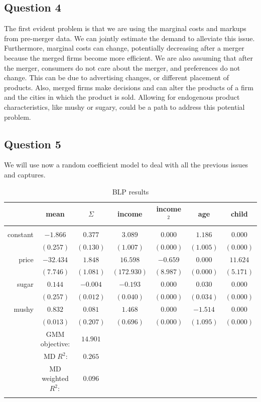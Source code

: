 \documentclass{article}
\theoremstyle{definition}
\begin{document}
\subsection*{Question 4}
The first evident problem is that we are using the marginal costs and markups from pre-merger data. We can jointly estimate the demand to alleviate this issue. Furthermore, marginal costs can change, potentially decreasing after a merger because the merged firms become more efficient. We are also assuming that after the merger, consumers do not care about the merger, and preferences do not change. This can be due to advertising changes, or different placement of products. Also, merged firms make decisions and can alter the products of a firm and the cities in which the product is sold. Allowing for endogenous product characteristics, like mushy or sugary, could be a path to address this potential problem. 

\subsection*{Question 5}

We will use now a random coefficient model to deal with all the previous issues and captures.
\begin{table}[h]
    \centering
\begin{tabular}{rcccccc} 
\hline 
& mean & $\Sigma$ & income & income $^{2}$ & age &  child \\
\hline & & & & & & \\
constant & $-1.866$ & $0.377$ & $3.089$ & $0.000$ & $1.186$ & $0.000$ \\
& $(0.257)$ & $(0.130)$ & $(1.007)$ & $(0.000)$ & $(1.005)$ & $(0.000)$ \\
price & $-32.434$ & $1.848$ & $16.598$ & $-0.659$ & $0.000$ & $11.624$ \\
& $(7.746)$ & $(1.081)$ & $(172.930)$ & $(8.987)$ & $(0.000)$ & $(5.171)$ \\
sugar & $0.144$ & $-0.004$ & $-0.193$ & $0.000$ & $0.030$ & $0.000$ \\
& $(0.257)$ & $(0.012)$ & $(0.040)$ & $(0.000)$ & $(0.034)$ & $(0.000)$ \\
mushy & $0.832$ & $0.081$ & $1.468$ & $0.000$ & $-1.514$ & $0.000$ \\
& $(0.013)$ & $(0.207)$ & $(0.696)$ & $(0.000)$ & $(1.095)$ & $(0.000)$\\
\hline 
& GMM objective: &$14.901$\\
& $\operatorname{MD} R^{2}: $ &$0.265$\\
&$\mathrm{MD}$ weighted $R^{2}:$&$ 0.096$\\
\hline & & & & & & \\
\end{tabular}
    \caption{ BLP results}
    \label{tab:my_label}
\end{table}
\end{document}
